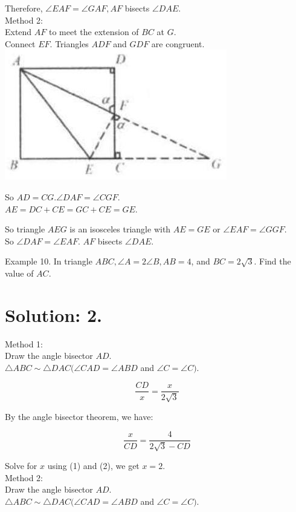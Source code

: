 \documentclass[10pt]{article}
\begin{document}
Therefore, \(\angle E A F=\angle G A F, A F\) bisects \(\angle D A E\).\\
Method 2:\\
Extend \(A F\) to meet the extension of \(B C\) at \(G\).\\
Connect \(E F\). Triangles \(A D F\) and \(G D F\) are congruent.\\
\includegraphics[max width=\textwidth, center]{2025_04_17_97bc1f7e44d93c271a88g-060(2)}

So \(A D=C G . \angle D A F=\angle C G F\).\\
\(A E=D C+C E=G C+C E=G E\).

So triangle \(A E G\) is an isosceles triangle with \(A E=G E\) or \(\angle E A F=\angle G G F\).\\
So \(\angle D A F=\angle E A F\). \(A F\) bisects \(\angle D A E\).

Example 10. In triangle \(A B C, \angle A=2 \angle B, A B=4\), and \(B C=2 \sqrt{3}\). Find the value of \(A C\).

\section*{Solution: 2.}
Method 1:\\
Draw the angle bisector \(A D\).\\
\(\triangle A B C \sim \triangle D A C(\angle C A D=\angle A B D\) and \(\angle C=\angle C)\).

\[
\frac{C D}{x}=\frac{x}{2 \sqrt{3}}
\]

By the angle bisector theorem, we have:

\[
\frac{x}{C D}=\frac{4}{2 \sqrt{3}-C D}
\]

Solve for \(x\) using (1) and (2), we get \(x=2\).\\
Method 2:\\
Draw the angle bisector \(A D\).\\
\(\triangle A B C \sim \triangle D A C(\angle C A D=\angle A B D\) and \(\angle C=\angle C)\).
\end{document}
